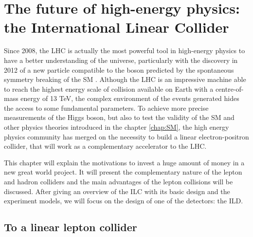 \chapter[The ILC]{The future of high-energy physics: the International Linear Collider}
\label{chap:ILC}



  Since 2008, the \gls{LHC} is actually the most powerful tool in high-energy physics to have a better understanding of the universe, particularly with the discovery in 2012 of a new particle compatible to the boson predicted by the spontaneous symmetry breaking of the SM \cite{Aad2012, Chatrchyan2012}.
  Although the \gls{LHC} is an impressive machine able to reach the highest energy scale of collision available on Earth with a centre-of-mass energy of 13 TeV, the complex environment of the events generated hides the access to some fundamental parameters. 
  To achieve more precise measurements of the Higgs boson, but also to test the validity of the SM and other physics theories introduced in the chapter \ref{chap:SM}, the high energy physics community has merged on the necessity to build a linear electron-positron collider, that will work as a complementary accelerator to the \gls{LHC}.
  
  This chapter will explain the motivations to invest a huge amount of money in a new great world project. 
  It will present the complementary nature of the lepton and hadron colliders and the main advantages of the lepton collisions will be discussed.
  After giving an overview of the ILC with its basic design and the experiment models, we will focus on the design of one of the detectors: the \gls{ILD}.

 \minitoc
  
  \section{To a linear lepton collider}
 
